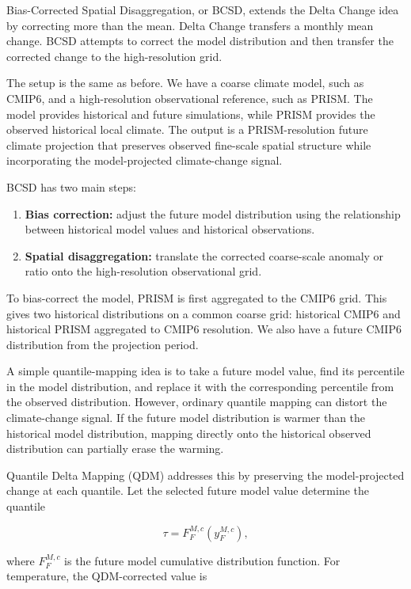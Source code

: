 \documentclass[11pt]{article}
\begin{document}
Bias-Corrected Spatial Disaggregation, or BCSD, extends the Delta Change idea by correcting more than the mean. Delta Change transfers a monthly mean change. BCSD attempts to correct the model distribution and then transfer the corrected change to the high-resolution grid.

The setup is the same as before. We have a coarse climate model, such as CMIP6, and a high-resolution observational reference, such as PRISM. The model provides historical and future simulations, while PRISM provides the observed historical local climate. The output is a PRISM-resolution future climate projection that preserves observed fine-scale spatial structure while incorporating the model-projected climate-change signal.

BCSD has two main steps:
\begin{enumerate}
    \item \textbf{Bias correction:} adjust the future model distribution using the relationship between historical model values and historical observations.
    \item \textbf{Spatial disaggregation:} translate the corrected coarse-scale anomaly or ratio onto the high-resolution observational grid.
\end{enumerate}

To bias-correct the model, PRISM is first aggregated to the CMIP6 grid. This gives two historical distributions on a common coarse grid: historical CMIP6 and historical PRISM aggregated to CMIP6 resolution. We also have a future CMIP6 distribution from the projection period.

A simple quantile-mapping idea is to take a future model value, find its percentile in the model distribution, and replace it with the corresponding percentile from the observed distribution. However, ordinary quantile mapping can distort the climate-change signal. If the future model distribution is warmer than the historical model distribution, mapping directly onto the historical observed distribution can partially erase the warming.

Quantile Delta Mapping (QDM) addresses this by preserving the model-projected change at each quantile. Let the selected future model value determine the quantile

\begin{equation}
\tau = F_{F}^{M,c}\left(y_F^{M,c}\right),
\end{equation}

where $F_F^{M,c}$ is the future model cumulative distribution function. For temperature, the QDM-corrected value is
\end{document}
